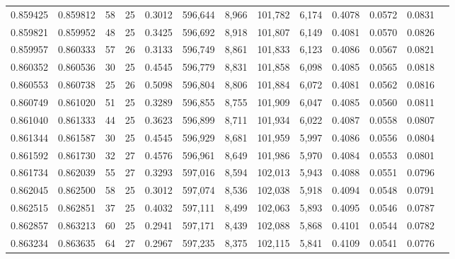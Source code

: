 \begin{tabular}{rrrrrrrrrrrrr}
0.859425 & 0.859812 &    58 &  25 &                                     0.3012 & 596,644 &   8,966 & 101,782 &   6,174 & 0.4078 & 0.0572 & 0.0831 \\
0.859821 & 0.859952 &    48 &  25 &                                     0.3425 & 596,692 &   8,918 & 101,807 &   6,149 & 0.4081 & 0.0570 & 0.0826 \\
0.859957 & 0.860333 &    57 &  26 &                                     0.3133 & 596,749 &   8,861 & 101,833 &   6,123 & 0.4086 & 0.0567 & 0.0821 \\
0.860352 & 0.860536 &    30 &  25 &                                     0.4545 & 596,779 &   8,831 & 101,858 &   6,098 & 0.4085 & 0.0565 & 0.0818 \\
0.860553 & 0.860738 &    25 &  26 &                                     0.5098 & 596,804 &   8,806 & 101,884 &   6,072 & 0.4081 & 0.0562 & 0.0816 \\
0.860749 & 0.861020 &    51 &  25 &                                     0.3289 & 596,855 &   8,755 & 101,909 &   6,047 & 0.4085 & 0.0560 & 0.0811 \\
0.861040 & 0.861333 &    44 &  25 &                                     0.3623 & 596,899 &   8,711 & 101,934 &   6,022 & 0.4087 & 0.0558 & 0.0807 \\
0.861344 & 0.861587 &    30 &  25 &                                     0.4545 & 596,929 &   8,681 & 101,959 &   5,997 & 0.4086 & 0.0556 & 0.0804 \\
0.861592 & 0.861730 &    32 &  27 &                                     0.4576 & 596,961 &   8,649 & 101,986 &   5,970 & 0.4084 & 0.0553 & 0.0801 \\
0.861734 & 0.862039 &    55 &  27 &                                     0.3293 & 597,016 &   8,594 & 102,013 &   5,943 & 0.4088 & 0.0551 & 0.0796 \\
0.862045 & 0.862500 &    58 &  25 &                                     0.3012 & 597,074 &   8,536 & 102,038 &   5,918 & 0.4094 & 0.0548 & 0.0791 \\
0.862515 & 0.862851 &    37 &  25 &                                     0.4032 & 597,111 &   8,499 & 102,063 &   5,893 & 0.4095 & 0.0546 & 0.0787 \\
0.862857 & 0.863213 &    60 &  25 &                                     0.2941 & 597,171 &   8,439 & 102,088 &   5,868 & 0.4101 & 0.0544 & 0.0782 \\
0.863234 & 0.863635 &    64 &  27 &                                     0.2967 & 597,235 &   8,375 & 102,115 &   5,841 & 0.4109 & 0.0541 & 0.0776 \\

\end{tabular}
